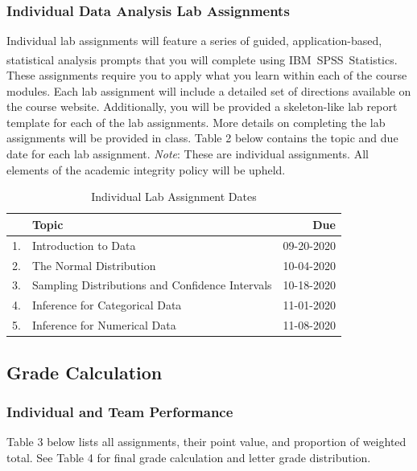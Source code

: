 \documentclass[
]{article}
\begin{document}
\subsubsection{Individual Data Analysis Lab Assignments}

Individual lab assignments will feature a series of guided,
application-based, statistical analysis prompts that you will complete
using
IBM\textsuperscript{\textregistered}~SPSS\textsuperscript{\textregistered}~Statistics.
These assignments require you to apply what you learn within each of the
course modules. Each lab assignment will include a detailed set of
directions available on the course website. Additionally, you will be
provided a skeleton-like lab report template for each of the lab
assignments. More details on completing the lab assignments will be
provided in class. Table 2 below contains the topic and due date for
each lab assignment. \emph{Note}: These are individual assignments. All
elements of the academic integrity policy will be upheld.

\begin{table}[H]
\begin{center}
\caption{Individual Lab Assignment Dates}
\label{labs}
\vspace{3mm}
\begin{tabular}{llr}
\hline
 & {\bf{Topic}} & {\bf{Due}}\\
\hline
1. & Introduction to Data & 09-20-2020\\
2. & The Normal Distribution & 10-04-2020\\
3. & Sampling Distributions and Confidence Intervals & 10-18-2020\\
4. & Inference for Categorical Data & 11-01-2020\\
5. & Inference for Numerical Data & 11-08-2020\\
\hline
\end{tabular}
\end{center}
\end{table}

\subsection{Grade Calculation}

\subsubsection{Individual and Team Performance}

Table 3 below lists all assignments, their point value, and proportion
of weighted total. See Table 4 for final grade calculation and letter
grade distribution.
\end{document}

